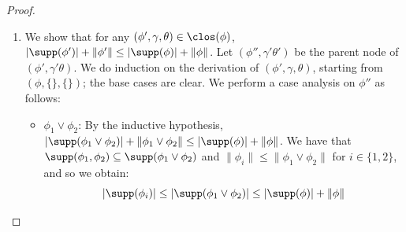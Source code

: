 \begin{proof}
\begin{enumerate}
\begin{itemize}
			By definition, we have that
			\[
			\clos_\phi((\mu X(\vec x).\psi')(\vec a), \gamma, \theta) = \{(\mu X(\vec x).\psi')(\vec a), \gamma, \theta)\} \cup \clos_\phi(\hat \psi, (\gamma, \{\vec a / \vec x\}), \theta')
			\]
			and by Lemma~\ref{lem:unionOrb2}:
			\[
			\orb[\Ncal](\clos_\phi((\mu X(\vec x).\psi')(\vec a),\gamma, \theta)) \subseteq \{((\mu X(\vec x).\psi')(\vec a),\gamma, \theta)\} \cup \orb[\Ncal](\clos_\phi(\hat \psi,(\gamma, \{\vec a/\vec x\}), \theta'))
			\]
			By the inductive hypothesis, we have:
			\[
			|\orb[\Ncal](\clos_\phi(\hat \psi,(\gamma, \{\vec a/\vec x\}) \theta'))| \le |\hat \psi|\cdot m'   (\hat \psi,(\gamma, \{\vec a/\vec x\}),\theta')
			\]
			We note that
			$m'(\hat \psi,(\gamma, \{\vec a/\vec x\}),\theta') = m'(\psi,\gamma,\theta)$, thus obtaining:
			\begin{align*}
				|\orb[\Ncal](\clos_\phi(\psi,\gamma, \theta))| &\le |\orb[\Ncal](\clos_\phi(\hat \psi,(\gamma, \{\vec a/\vec x\})\theta'))| + 1
				\\ &\overset{\text{IH}}{\le} |\hat \psi|\cdot m'(\hat \psi) + 1
				\\ &\leq (|\vec x| + |\psi'|)\cdot m'(\psi,\gamma,\theta) + 1
				\leq |\psi|\cdot m'(\psi,\gamma,\theta)
			\end{align*}
			A similar argument can be shown for $(\nu X(\vec x).\psi')(\vec a)$.
		\end{itemize}
		\item    We show that for any $(\phi',\gamma, \theta) \in \clos(\phi)$, $|\supp(\phi')| + \|\phi'\| \le |\supp(\phi)| + \|\phi\|$.
		Let $(\phi'',\gamma'\theta')$ be the parent node of $(\phi',\gamma' \theta)$.
		We do induction on the derivation of $(\phi',\gamma, \theta)$, starting from $(\phi,\{\}, \{\})$; the base cases are clear.
		We perform a case analysis on $\phi''$ as follows:
		\begin{itemize}
			\item $\phi_1 \lor \phi_2$: 
			By the inductive hypothesis, $|\supp(\phi_1 \lor \phi_2)| + \|\phi_1 \lor \phi_2\| \le |\supp(\phi)| + \|\phi\|$. 
			We have that $\supp(\phi_1,\phi_2) \subseteq \supp(\phi_1 \lor \phi_2)$ and $\|\phi_i\| \le \|\phi_1 \lor \phi_2\|$ for $i \in \{1,2\}$, and so we obtain:
			\[
			|\supp(\phi_i)| \le |\supp(\phi_1 \lor \phi_2)| \le  |\supp(\phi)| + \|\phi\|
\]
\end{itemize}
\end{enumerate}
\end{proof}
